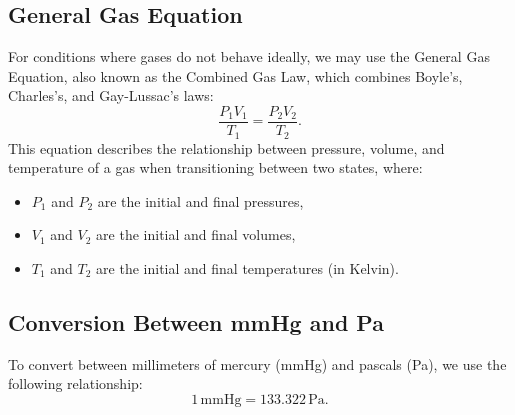 \documentclass{report}
\begin{document}
\subsection{General Gas Equation}
For conditions where gases do not behave ideally, we may use the General Gas Equation, also known as the Combined Gas Law, which combines Boyle's, Charles's, and Gay-Lussac's laws:
\[
	\frac{P_1 V_1}{T_1} = \frac{P_2 V_2}{T_2}.
\]
This equation describes the relationship between pressure, volume, and temperature of a gas when transitioning between two states, where:
\begin{itemize}
	\item \( P_1 \) and \( P_2 \) are the initial and final pressures,
	\item \( V_1 \) and \( V_2 \) are the initial and final volumes,
	\item \( T_1 \) and \( T_2 \) are the initial and final temperatures (in Kelvin).
\end{itemize}


\subsection{Conversion Between mmHg and Pa}

To convert between millimeters of mercury (mmHg) and pascals (Pa), we use the following relationship:
\[
	1 \, \text{mmHg} = 133.322 \, \text{Pa}.
\]
\end{document}
